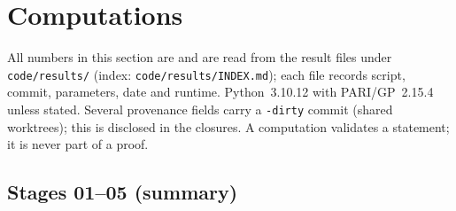 \section{Computations}\label{sec:comp}
All numbers in this section are \stcomp{} and are read from the result files under \texttt{code/results/} (index:
\texttt{code/results/INDEX.md}); each file records script, commit, parameters, date and runtime. Python~3.10.12 with
PARI/GP~2.15.4 unless stated. Several provenance fields carry a \texttt{-dirty} commit (shared worktrees); this is disclosed
in the closures. A computation validates a statement; it is never part of a proof.

\subsection{Stages 01--05 (summary)}
